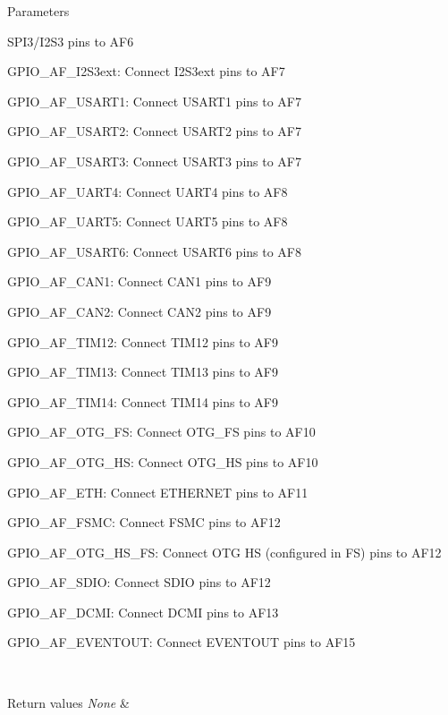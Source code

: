 \begin{DoxyParams}{Parameters}
\begin{DoxyItemize}
S\+P\+I3/\+I2\+S3 pins to A\+F6 \item G\+P\+I\+O\+\_\+\+A\+F\+\_\+\+I2\+S3ext\+: Connect I2\+S3ext pins to A\+F7 \item G\+P\+I\+O\+\_\+\+A\+F\+\_\+\+U\+S\+A\+R\+T1\+: Connect U\+S\+A\+R\+T1 pins to A\+F7 \item G\+P\+I\+O\+\_\+\+A\+F\+\_\+\+U\+S\+A\+R\+T2\+: Connect U\+S\+A\+R\+T2 pins to A\+F7 \item G\+P\+I\+O\+\_\+\+A\+F\+\_\+\+U\+S\+A\+R\+T3\+: Connect U\+S\+A\+R\+T3 pins to A\+F7 \item G\+P\+I\+O\+\_\+\+A\+F\+\_\+\+U\+A\+R\+T4\+: Connect U\+A\+R\+T4 pins to A\+F8 \item G\+P\+I\+O\+\_\+\+A\+F\+\_\+\+U\+A\+R\+T5\+: Connect U\+A\+R\+T5 pins to A\+F8 \item G\+P\+I\+O\+\_\+\+A\+F\+\_\+\+U\+S\+A\+R\+T6\+: Connect U\+S\+A\+R\+T6 pins to A\+F8 \item G\+P\+I\+O\+\_\+\+A\+F\+\_\+\+C\+A\+N1\+: Connect C\+A\+N1 pins to A\+F9 \item G\+P\+I\+O\+\_\+\+A\+F\+\_\+\+C\+A\+N2\+: Connect C\+A\+N2 pins to A\+F9 \item G\+P\+I\+O\+\_\+\+A\+F\+\_\+\+T\+I\+M12\+: Connect T\+I\+M12 pins to A\+F9 \item G\+P\+I\+O\+\_\+\+A\+F\+\_\+\+T\+I\+M13\+: Connect T\+I\+M13 pins to A\+F9 \item G\+P\+I\+O\+\_\+\+A\+F\+\_\+\+T\+I\+M14\+: Connect T\+I\+M14 pins to A\+F9 \item G\+P\+I\+O\+\_\+\+A\+F\+\_\+\+O\+T\+G\+\_\+\+F\+S\+: Connect O\+T\+G\+\_\+\+F\+S pins to A\+F10 \item G\+P\+I\+O\+\_\+\+A\+F\+\_\+\+O\+T\+G\+\_\+\+H\+S\+: Connect O\+T\+G\+\_\+\+H\+S pins to A\+F10 \item G\+P\+I\+O\+\_\+\+A\+F\+\_\+\+E\+T\+H\+: Connect E\+T\+H\+E\+R\+N\+E\+T pins to A\+F11 \item G\+P\+I\+O\+\_\+\+A\+F\+\_\+\+F\+S\+M\+C\+: Connect F\+S\+M\+C pins to A\+F12 \item G\+P\+I\+O\+\_\+\+A\+F\+\_\+\+O\+T\+G\+\_\+\+H\+S\+\_\+\+F\+S\+: Connect O\+T\+G H\+S (configured in F\+S) pins to A\+F12 \item G\+P\+I\+O\+\_\+\+A\+F\+\_\+\+S\+D\+I\+O\+: Connect S\+D\+I\+O pins to A\+F12 \item G\+P\+I\+O\+\_\+\+A\+F\+\_\+\+D\+C\+M\+I\+: Connect D\+C\+M\+I pins to A\+F13 \item G\+P\+I\+O\+\_\+\+A\+F\+\_\+\+E\+V\+E\+N\+T\+O\+U\+T\+: Connect E\+V\+E\+N\+T\+O\+U\+T pins to A\+F15 \end{DoxyItemize}
\\
\hline
\end{DoxyParams}

\begin{DoxyRetVals}{Return values}
{\em None} & \\
\hline
\end{DoxyRetVals}
